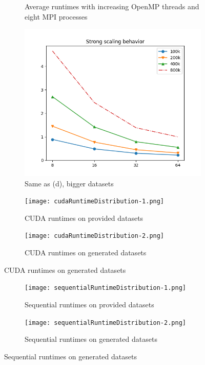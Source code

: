\documentclass{article}
\begin{document}
\begin{figure}[p]
\begin{subfigure}{0.40\textwidth}
        \caption{Average runtimes with increasing OpenMP threads and eight MPI processes}
        \label{fig:image4}
    \end{subfigure}
    \begin{subfigure}{0.40\textwidth}
        \includegraphics[width=\textwidth]{png/StrongScaling.png}
        \caption{Same as (d), bigger datasets}
        \label{fig:image5}
    \end{subfigure}
    \begin{subfigure}{0.40\textwidth}
        \texttt{[image: cudaRuntimeDistribution-1.png]}
        \caption{CUDA runtimes on provided datasets}
        \label{fig:image6}
    \end{subfigure}
    \begin{subfigure}{0.40\textwidth}
        \texttt{[image: cudaRuntimeDistribution-2.png]}
        \caption{CUDA runtimes on generated datasets}
        \label{fig:image7}
    \end{subfigure}
    \label{fig:bothimages}
\end{figure}

\clearpage
\begin{figure}[H]
    \centering
     \begin{subfigure}{0.40\textwidth}
        \texttt{[image: sequentialRuntimeDistribution-1.png]}
        \caption{Sequential runtimes on provided datasets}
        \label{fig:image1}
    \end{subfigure}
     \begin{subfigure}{0.40\textwidth}
        \texttt{[image: sequentialRuntimeDistribution-2.png]}
        \caption{Sequential runtimes on generated datasets}
        \label{fig:image2}
    \end{subfigure}
\end{figure}
\end{document}
